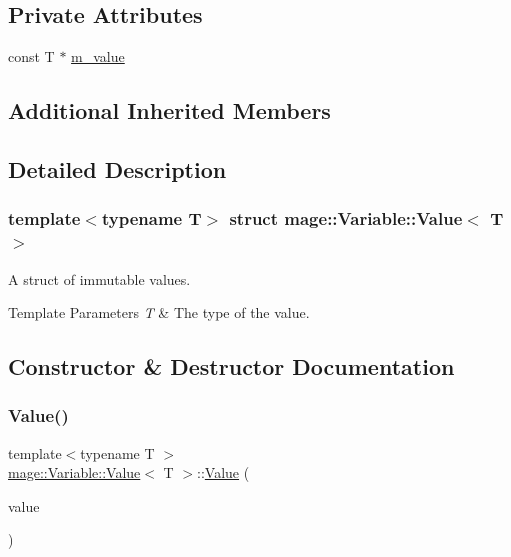 \subsection*{Private Attributes}
\begin{DoxyCompactItemize}
\item 
const T $\ast$ \hyperlink{structmage_1_1_variable_1_1_value_aa15243b8811b108a0c7bff05456e377c}{m\+\_\+value}
\end{DoxyCompactItemize}
\subsection*{Additional Inherited Members}


\subsection{Detailed Description}
\subsubsection*{template$<$typename T$>$\newline
struct mage\+::\+Variable\+::\+Value$<$ T $>$}

A struct of immutable values. 
\begin{DoxyTemplParams}{Template Parameters}
{\em T} & The type of the value. \\
\hline
\end{DoxyTemplParams}


\subsection{Constructor \& Destructor Documentation}
\hypertarget{structmage_1_1_variable_1_1_value_a1e29cc5eaeb8356a11a1eca0232cf162}{}\label{structmage_1_1_variable_1_1_value_a1e29cc5eaeb8356a11a1eca0232cf162} 
\subsubsection{\texorpdfstring{Value()}{Value()}\hspace{0.1cm}{\footnotesize\ttfamily [1/3]}}
{\footnotesize\ttfamily template$<$typename T $>$ \\
\hyperlink{structmage_1_1_variable_1_1_value}{mage\+::\+Variable\+::\+Value}$<$ T $>$\+::\hyperlink{structmage_1_1_variable_1_1_value}{Value} (\begin{DoxyParamCaption}\item[{const T $\ast$}]{value }\end{DoxyParamCaption})}

